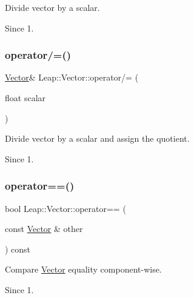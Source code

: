 Divide vector by a scalar.


\begin{DoxyCodeInclude}
\end{DoxyCodeInclude}
 \begin{DoxySince}{Since}
1. 
\end{DoxySince}
\mbox{\label{struct_leap_1_1_vector_a0c83e9d07018bdb3b3404088939a050d}} 
\subsubsection{\texorpdfstring{operator/=()}{operator/=()}}
{\footnotesize\ttfamily \hyperlink{struct_leap_1_1_vector}{Vector}\& Leap\+::\+Vector\+::operator/= (\begin{DoxyParamCaption}\item[{float}]{scalar }\end{DoxyParamCaption})\hspace{0.3cm}{\ttfamily [inline]}}

Divide vector by a scalar and assign the quotient. \begin{DoxySince}{Since}
1. 
\end{DoxySince}
\mbox{\label{struct_leap_1_1_vector_af169611d1e4c49140af6dac3e780c799}} 
\subsubsection{\texorpdfstring{operator==()}{operator==()}}
{\footnotesize\ttfamily bool Leap\+::\+Vector\+::operator== (\begin{DoxyParamCaption}\item[{const \hyperlink{struct_leap_1_1_vector}{Vector} \&}]{other }\end{DoxyParamCaption}) const\hspace{0.3cm}{\ttfamily [inline]}}

Compare \hyperlink{struct_leap_1_1_vector}{Vector} equality component-\/wise.


\begin{DoxyCodeInclude}
\end{DoxyCodeInclude}
 \begin{DoxySince}{Since}
1. 
\end{DoxySince}
\mbox{\label{struct_leap_1_1_vector_ac6c64bca87edb6a37975f9cec4a49281}} 
